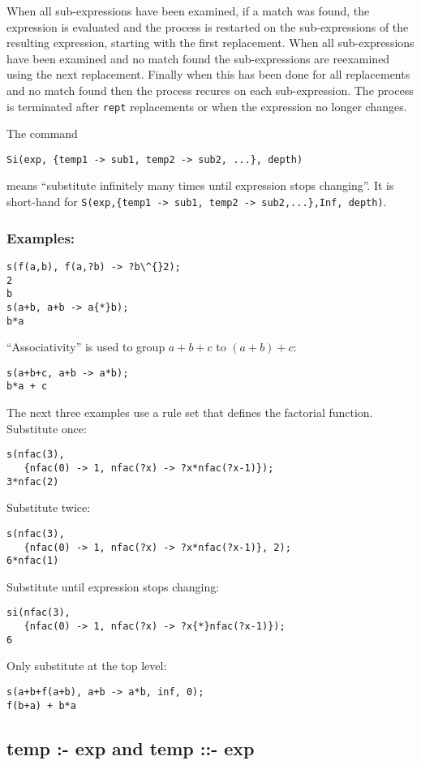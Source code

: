 When all sub-expressions have been examined, if a match was found, the
expression is evaluated and the process is restarted on the sub-expressions of
the resulting expression, starting with the first replacement.  When all
sub-expressions have been examined and no match found the sub-expressions are
reexamined using the next replacement.  Finally when this has been done for all
replacements and no match found then the process recures on each sub-expression.
The process is terminated after \texttt{rept} replacements or when the
expression no longer changes.

The command
\begin{verbatim}
Si(exp, {temp1 -> sub1, temp2 -> sub2, ...}, depth)
\end{verbatim}
means ``substitute infinitely many times until expression stops changing''.  It
is short-hand for \texttt{S(exp,\{temp1 -> sub1, temp2 -> sub2,...\},Inf, depth)}.


\subsubsection*{Examples:}

\begin{verbatim}
s(f(a,b), f(a,?b) -> ?b\^{}2);
2
b
s(a+b, a+b -> a{*}b);
b*a
\end{verbatim}
``Associativity'' is used to group $a+b+c$ to $(a+b)+c$:
\begin{verbatim}
s(a+b+c, a+b -> a*b);
b*a + c
\end{verbatim}
The next three examples use a rule set that defines the factorial function.
Substitute once:
\begin{verbatim}
s(nfac(3),
   {nfac(0) -> 1, nfac(?x) -> ?x*nfac(?x-1)});
3*nfac(2)
\end{verbatim}
Substitute twice:
\begin{verbatim}
s(nfac(3),
   {nfac(0) -> 1, nfac(?x) -> ?x*nfac(?x-1)}, 2);
6*nfac(1)
\end{verbatim}
Substitute until expression stops changing:
\begin{verbatim}
si(nfac(3),
   {nfac(0) -> 1, nfac(?x) -> ?x{*}nfac(?x-1)});
6
\end{verbatim}
Only substitute at the top level:
\begin{verbatim}
s(a+b+f(a+b), a+b -> a*b, inf, 0);
f(b+a) + b*a
\end{verbatim}



\subsection{temp :- exp and temp ::- exp}
\hypertarget{reserved:rsetop}{}
\hypertarget{reserved:rsetdop}{}

